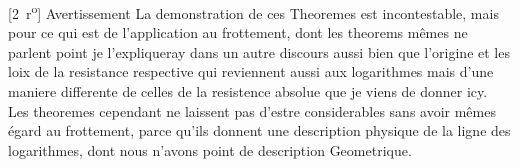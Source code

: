 [2~r\textsuperscript{o}]
\pend
\count{}
\count{}
\vspace{1em}
\pstart
\centering
Avertissement
\pend
\pstart
\noindent
La demonstration de ces Theoremes est incontestable,
mais pour ce qui est de l'application au frottement\protect{},
dont les theorems m\^{e}mes ne parlent point
je l'expliqueray dans un autre discours aussi bien que l'origine et les loix de la resistance respective\protect{}
qui reviennent aussi aux logarithmes
mais d'une maniere differente de celles de la resistence absolue\protect{}
que je viens de donner icy.
Les theoremes cependant ne laissent pas d'estre considerables sans avoir m\^{e}mes \'{e}gard au frottement,
parce qu'ils donnent une description physique de la ligne des logarithmes,
dont nous n'avons point de description Geometrique.
\pend
\vspace{1em}
\pstart

